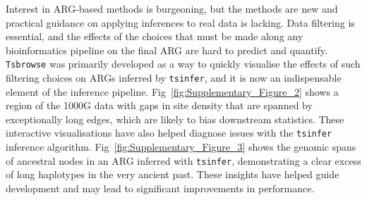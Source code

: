 \documentclass[unnumsec,webpdf,contemporary,large,namedate]{oup-authoring-template}%
\begin{document}
Interest in ARG-based methods is burgeoning, but the methods are new
and practical guidance on applying inferences to real data is lacking.
Data filtering is essential, and the effects of the
choices that must be made along any bioinformatics pipeline on the final
ARG are hard to predict and quantify. \texttt{Tsbrowse} was primarily
developed as a way to quickly visualise the effects of such filtering
choices on ARGs inferred by \texttt{tsinfer}, and it is now an indispensable
element of the inference pipeline. Fig~\ref{fig:Supplementary_Figure_2} 
shows a region of the 1000G data with gaps in site density that are spanned by
 exceptionally long edges, which are likely to bias downstream statistics.
These interactive visualisations have also helped diagnose issues with
the \texttt{tsinfer} inference algorithm.
Fig~\ref{fig:Supplementary_Figure_3} shows the genomic spans of
ancestral nodes in an ARG inferred with \texttt{tsinfer}, demonstrating a clear
excess of long haplotypes in the very ancient past. These insights
have helped guide development and
may lead to significant improvements in performance.


\end{document}

